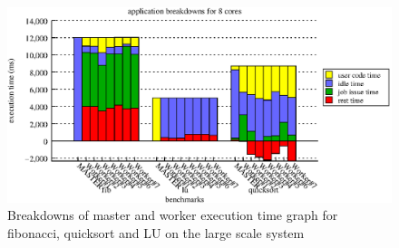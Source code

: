 \begin{figure}[!ht]
\includegraphics[width=\columnwidth]{figures/app_breakdowns_beowulf}
\caption{Breakdowns of master and worker execution time graph for fibonacci, quicksort and LU on the large scale system}
\label{fig:app_breakdowns_beowulf}
\end{figure}



